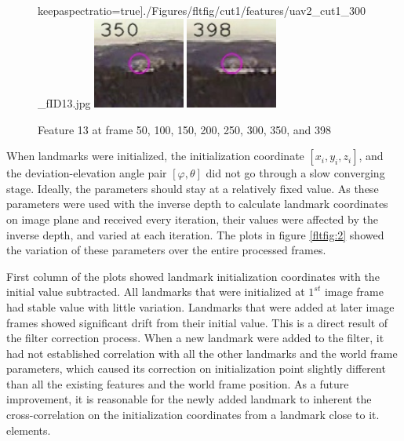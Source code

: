 \begin{figure}[h]
keepaspectratio=true]{./Figures/fltfig/cut1/features/uav2_cut1_300_fID13.jpg}
\includegraphics[width=3cm,
keepaspectratio=true]{./Figures/fltfig/cut1/features/uav2_cut1_350_fID13.jpg}
\includegraphics[width=3cm,
keepaspectratio=true]{./Figures/fltfig/cut1/features/uav2_cut1_398_fID13.jpg}
\caption{Feature 13 at frame 50, 100, 150, 200, 250, 300, 350, and 398}
\label{fltfig:1_1}
\end{figure}

When landmarks were initialized, the initialization coordinate $[x_i,
y_i, z_i]$, and the deviation-elevation angle pair $[\varphi, \theta]$
did not go through a slow converging stage. Ideally, the parameters
should stay at a relatively fixed value. As these parameters were used
with the inverse depth to calculate landmark coordinates on image
plane and received every iteration, their values were affected by the
inverse depth, and varied at each iteration. The plots in figure
\ref{fltfig:2} showed the variation of these parameters over the
entire processed frames.

First column of the plots showed landmark initialization coordinates
with the initial value subtracted. All landmarks that were initialized
at $1^{st}$ image frame had stable value with little variation.
Landmarks that were added at later image frames showed significant
drift from their initial value. This is a direct result of the filter
correction process. When a new landmark were added to the filter, it
had not established correlation with all the other landmarks and the
world frame parameters, which caused its correction on initialization
point slightly different than all the existing features and the world
frame position. As a future improvement, it is reasonable for the
newly added landmark to inherent the cross-correlation on the
initialization coordinates from a landmark close to it. elements.

